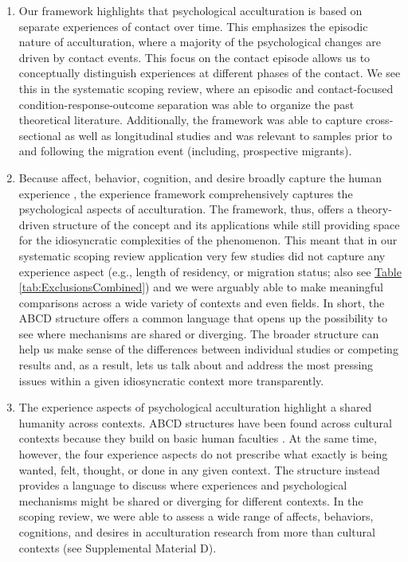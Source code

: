 \documentclass[man, 12pt, a4paper, mask]{apa7}
\newcommand{\tblref}[2][]{\hyperref[#2]{Table \ref*{#2}#1}}
\newcommand{\sicontext}{Supplemental Material D}
\begin{document}
\begin{enumerate}
\item Our framework highlights that psychological acculturation is based on separate experiences of contact over time. This emphasizes the episodic nature of acculturation, where a majority of the psychological changes are driven by contact events. This focus on the contact episode allows us to conceptually distinguish experiences at different phases of the contact. We see this in the systematic scoping review, where an episodic and contact-focused condition-response-outcome separation was able to organize the past theoretical literature. Additionally, the framework was able to capture cross-sectional as well as longitudinal studies and was relevant to samples prior to and following the migration event (including, prospective migrants). 

\item Because affect, behavior, cognition, and desire broadly capture the human experience \citep[e.g.,][]{Jhangiani2014}, the experience framework comprehensively captures the psychological aspects of acculturation. The framework, thus, offers a theory-driven structure of the concept and its applications while still providing space for the idiosyncratic complexities of the phenomenon. This meant that in our systematic scoping review application very few studies did not capture any experience aspect (e.g., length of residency, or migration status; also see \tblref{tab:ExclusionsCombined}) and we were arguably able to make meaningful comparisons across a wide variety of contexts and even fields. In short, the ABCD structure offers a common language that opens up the possibility to see where mechanisms are shared or diverging. The broader structure can help us make sense of the differences between individual studies or competing results and, as a result, lets us talk about and address the most pressing issues within a given idiosyncratic context more transparently.

\item The experience aspects of psychological acculturation highlight a shared humanity across contexts. ABCD structures have been found across cultural contexts because they build on basic human faculties \citep[e.g.,][]{Bhawuk2011}. At the same time, however, the four experience aspects do not prescribe what exactly is being wanted, felt, thought, or done in any given context. The structure instead provides a language to discuss where experiences and psychological mechanisms might be shared or diverging for different contexts. In the scoping review, we were able to assess a wide range of affects, behaviors, cognitions, and desires in acculturation research from more than \nCultureCombs cultural contexts (see \sicontext).


\end{enumerate}
\end{document}
